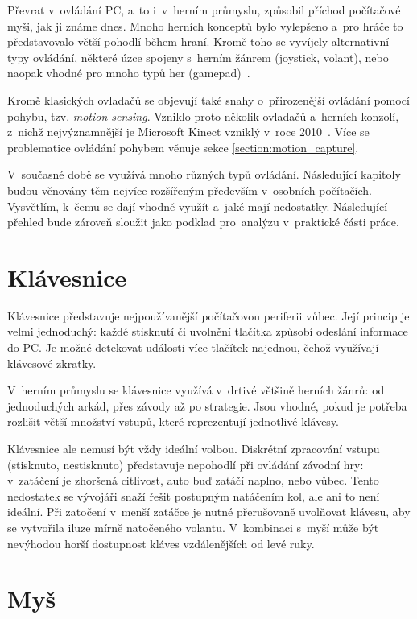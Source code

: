 \documentclass[thesis=B,czech,hidelinks]{FITthesis}[2012/06/26] %
\begin{document}
Převrat v~ovládání PC, a~to i~v~herním průmyslu, způsobil příchod počítačové myši, jak ji známe dnes. Mnoho herních konceptů bylo vylepšeno a~pro hráče to představovalo větší pohodlí během hraní. Kromě toho se vyvíjely alternativní typy ovládání, některé úzce spojeny s~herním žánrem (joystick, volant), nebo naopak vhodné pro mnoho typů her (gamepad)~\cite{gamevshardware}.

Kromě klasických ovladačů se objevují také snahy o~přirozenější ovládání pomocí pohybu, tzv. \textit{motion sensing}. Vzniklo proto několik ovladačů a~herních konzolí, z~nichž nejvýznamnější je Microsoft Kinect vzniklý v~roce 2010~\cite{wikicontrollers}. Více se problematice ovládání pohybem věnuje sekce \ref{section:motion_capture}.

V~současné době se využívá mnoho různých typů ovládání. Následující kapitoly budou věnovány těm nejvíce rozšířeným především v~osobních počítačích. Vysvětlím, k~čemu se dají vhodně využít a~jaké mají nedostatky. Následující přehled bude zároveň sloužit jako podklad pro~analýzu v~praktické části práce.

\section{Klávesnice}

Klávesnice představuje nejpoužívanější počítačovou periferii vůbec. Její princip je velmi jednoduchý: každé stisknutí či uvolnění tlačítka způsobí odeslání informace do PC. Je možné detekovat události více tlačítek najednou, čehož využívají klávesové zkratky.

V~herním průmyslu se klávesnice využívá v~drtivé většině herních žánrů: od jednoduchých arkád, přes závody až po strategie. Jsou vhodné, pokud je potřeba rozlišit větší množství vstupů, které reprezentují jednotlivé klávesy.

Klávesnice ale nemusí být vždy ideální volbou. Diskrétní zpracování vstupu (stisknuto, nestisknuto) představuje nepohodlí při ovládání závodní hry: v~zatáčení je zhoršená citlivost, auto buď zatáčí naplno, nebo vůbec. Tento nedostatek se vývojáři snaží řešit postupným natáčením kol, ale ani to není ideální. Při zatočení v~menší zatáčce je nutné přerušovaně uvolňovat klávesu, aby se vytvořila iluze mírně natočeného volantu. V~kombinaci s~myší může být nevýhodou horší dostupnost kláves vzdálenějších od levé ruky.

\section{Myš}
\end{document}
